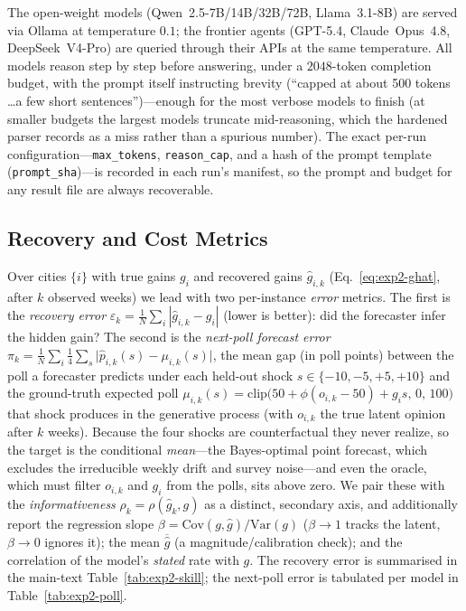 \documentclass{article} %
\begin{document}
The open-weight models (Qwen~2.5-7B/14B/32B/72B, Llama~3.1-8B) are served via Ollama at temperature
$0.1$; the frontier agents (GPT-5.4, Claude~Opus~4.8, DeepSeek~V4-Pro) are queried through their
APIs at the same temperature.  All models reason step by step before answering, under a $2048$-token
completion budget, with the prompt itself instructing brevity (``capped at about 500 tokens \ldots a
few short sentences'')---enough for the most verbose models to finish (at smaller budgets the largest
models truncate mid-reasoning, which the hardened parser records as a miss rather than a spurious
number).  The exact per-run configuration---\texttt{max\_tokens}, \texttt{reason\_cap}, and a hash of
the prompt template (\texttt{prompt\_sha})---is recorded in each run's manifest, so the prompt and
budget for any result file are always recoverable.

\subsection{Recovery and Cost Metrics}
\label{app:exp2-metrics}

Over cities $\{i\}$ with true gains $g_i$ and recovered gains $\hat g_{i,k}$
(Eq.~\eqref{eq:exp2-ghat}, after $k$ observed weeks) we lead with two per-instance \emph{error}
metrics.  The first is the \emph{recovery error} $\varepsilon_k=\frac1N\sum_i|\hat g_{i,k}-g_i|$
(lower is better): did the forecaster infer the hidden gain?  The second is the \emph{next-poll
forecast error} $\pi_k=\frac1N\sum_i\frac14\sum_{s}\bigl|\hat p_{i,k}(s)-\mu_{i,k}(s)\bigr|$, the
mean gap (in poll points) between the poll a forecaster predicts under each held-out shock
$s\in\{-10,-5,+5,+10\}$ and the ground-truth expected poll
$\mu_{i,k}(s)=\mathrm{clip}\bigl(50+\phi(o_{i,k}-50)+g_i s,\,0,\,100\bigr)$ that shock produces in the
generative process (with $o_{i,k}$ the true latent opinion after $k$ weeks).  Because the four shocks
are counterfactual they never realize, so the target is the conditional \emph{mean}---the
Bayes-optimal point forecast, which excludes the irreducible weekly drift and survey noise---and even
the oracle, which must filter $o_{i,k}$ and $g_i$ from the polls, sits above zero.  We pair these with
the \emph{informativeness} $\rho_k=\rho(\hat g_k,g)$ as a distinct, secondary axis, and additionally
report the regression slope $\beta=\mathrm{Cov}(g,\hat g)/\mathrm{Var}(g)$ ($\beta\!\to\!1$ tracks the
latent, $\beta\!\to\!0$ ignores it); the mean $\overline{\hat g}$ (a magnitude/calibration check); and
the correlation of the model's \emph{stated} rate with $g$.  The recovery error is summarised in the
main-text Table~\ref{tab:exp2-skill}; the next-poll error is tabulated per model in
Table~\ref{tab:exp2-poll}.
\end{document}

